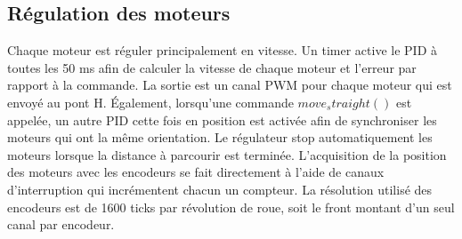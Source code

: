 \subsection{Régulation des moteurs}

Chaque moteur est réguler principalement en vitesse. Un timer active le PID à toutes les 50 ms afin de calculer la vitesse de chaque moteur et l’erreur par rapport à la commande. La sortie est un canal PWM pour chaque moteur qui est envoyé au pont H. Également, lorsqu’une commande $move_straight()$ est appelée, un autre PID cette fois en position est activée afin de synchroniser les moteurs qui ont la même orientation. Le régulateur stop automatiquement les moteurs lorsque la distance à parcourir est terminée. L'acquisition de la position des moteurs avec les encodeurs se fait directement à l’aide de canaux d’interruption qui incrémentent chacun un compteur. La résolution utilisé des encodeurs est de 1600 ticks par révolution de roue, soit le front montant d’un seul canal par encodeur.
